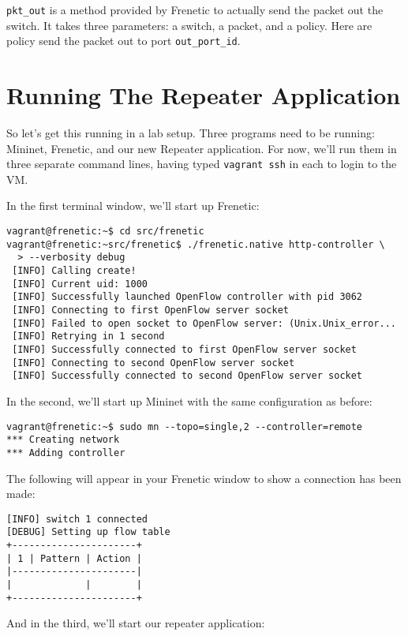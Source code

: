 \lstinline{pkt_out} is a method provided by Frenetic to actually send the packet out the switch.  It takes three 
parameters: a switch, a packet, and a policy.  
Here are policy send the packet out to port \lstinline{out_port_id}.   

\section{Running The Repeater Application}

So let's get this running in a lab setup.  
Three programs need to be running:  Mininet, Frenetic, and our new Repeater application.  
For now, we'll run them in three separate command lines, having typed \lstinline{vagrant ssh} in each
to login to the VM.

In the first terminal window, we'll start up Frenetic:

\begin{lstlisting}[style=BashInputStyle]
vagrant@frenetic:~$ cd src/frenetic
vagrant@frenetic:~src/frenetic$ ./frenetic.native http-controller \
  > --verbosity debug
 [INFO] Calling create!
 [INFO] Current uid: 1000
 [INFO] Successfully launched OpenFlow controller with pid 3062
 [INFO] Connecting to first OpenFlow server socket
 [INFO] Failed to open socket to OpenFlow server: (Unix.Unix_error...
 [INFO] Retrying in 1 second
 [INFO] Successfully connected to first OpenFlow server socket
 [INFO] Connecting to second OpenFlow server socket
 [INFO] Successfully connected to second OpenFlow server socket 
\end{lstlisting}

In the second, we'll start up Mininet with the same configuration as before:

\begin{lstlisting}[style=BashInputStyle]
vagrant@frenetic:~$ sudo mn --topo=single,2 --controller=remote
*** Creating network
*** Adding controller
\end{lstlisting}

The following will appear in your Frenetic window to show a connection has been made:

\begin{lstlisting}[style=BashInputStyle]
 [INFO] switch 1 connected
[DEBUG] Setting up flow table
+----------------------+
| 1 | Pattern | Action |
|----------------------|
|             |        |
+----------------------+
\end{lstlisting}

And in the third, we'll start our repeater application:

